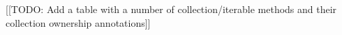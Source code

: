 







[[TODO: Add a table with a number of collection/iterable methods and their collection ownership annotations]]


